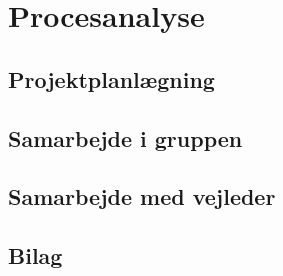 \chapter*{Procesanalyse}



\section{Projektplanlægning}


\section{Samarbejde i gruppen}


\section{Samarbejde med vejleder}


\section{Bilag}



